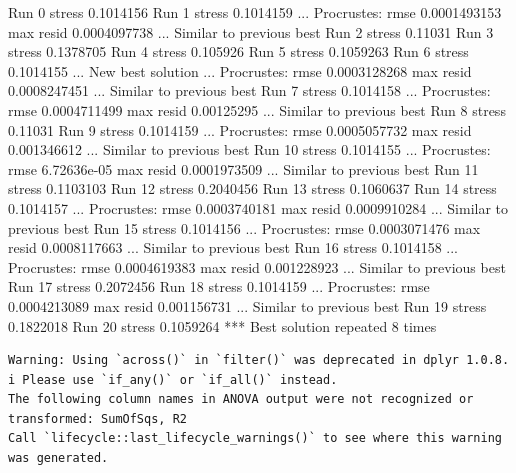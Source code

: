 \documentclass[
]{book}
\newenvironment{Shaded}{\begin{snugshade}}{\end{snugshade}}
\newcommand{\NormalTok}[1]{#1}
\begin{document}
\begin{Shaded}
\begin{Highlighting}[]
\NormalTok{Run 0 stress 0.1014156 }
\NormalTok{Run 1 stress 0.1014159 }
\NormalTok{... Procrustes: rmse 0.0001493153  max resid 0.0004097738 }
\NormalTok{... Similar to previous best}
\NormalTok{Run 2 stress 0.11031 }
\NormalTok{Run 3 stress 0.1378705 }
\NormalTok{Run 4 stress 0.105926 }
\NormalTok{Run 5 stress 0.1059263 }
\NormalTok{Run 6 stress 0.1014155 }
\NormalTok{... New best solution}
\NormalTok{... Procrustes: rmse 0.0003128268  max resid 0.0008247451 }
\NormalTok{... Similar to previous best}
\NormalTok{Run 7 stress 0.1014158 }
\NormalTok{... Procrustes: rmse 0.0004711499  max resid 0.00125295 }
\NormalTok{... Similar to previous best}
\NormalTok{Run 8 stress 0.11031 }
\NormalTok{Run 9 stress 0.1014159 }
\NormalTok{... Procrustes: rmse 0.0005057732  max resid 0.001346612 }
\NormalTok{... Similar to previous best}
\NormalTok{Run 10 stress 0.1014155 }
\NormalTok{... Procrustes: rmse 6.72636e{-}05  max resid 0.0001973509 }
\NormalTok{... Similar to previous best}
\NormalTok{Run 11 stress 0.1103103 }
\NormalTok{Run 12 stress 0.2040456 }
\NormalTok{Run 13 stress 0.1060637 }
\NormalTok{Run 14 stress 0.1014157 }
\NormalTok{... Procrustes: rmse 0.0003740181  max resid 0.0009910284 }
\NormalTok{... Similar to previous best}
\NormalTok{Run 15 stress 0.1014156 }
\NormalTok{... Procrustes: rmse 0.0003071476  max resid 0.0008117663 }
\NormalTok{... Similar to previous best}
\NormalTok{Run 16 stress 0.1014158 }
\NormalTok{... Procrustes: rmse 0.0004619383  max resid 0.001228923 }
\NormalTok{... Similar to previous best}
\NormalTok{Run 17 stress 0.2072456 }
\NormalTok{Run 18 stress 0.1014159 }
\NormalTok{... Procrustes: rmse 0.0004213089  max resid 0.001156731 }
\NormalTok{... Similar to previous best}
\NormalTok{Run 19 stress 0.1822018 }
\NormalTok{Run 20 stress 0.1059264 }
\NormalTok{*** Best solution repeated 8 times}
\end{Highlighting}
\end{Shaded}

\begin{verbatim}
Warning: Using `across()` in `filter()` was deprecated in dplyr 1.0.8.
i Please use `if_any()` or `if_all()` instead.
The following column names in ANOVA output were not recognized or transformed: SumOfSqs, R2
Call `lifecycle::last_lifecycle_warnings()` to see where this warning was generated.
\end{verbatim}
\end{document}
